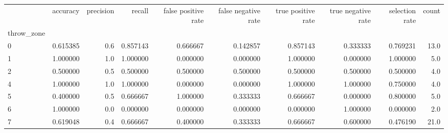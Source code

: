 \begin{tabular}{lrrrrrrrrr}
\toprule
{} &  accuracy &  precision &    recall &  false positive rate &  false negative rate &  true positive rate &  true negative rate &  selection rate &  count \\
throw\_zone &           &            &           &                      &                      &                     &                     &                 &        \\
\midrule
0          &  0.615385 &        0.6 &  0.857143 &             0.666667 &             0.142857 &            0.857143 &            0.333333 &        0.769231 &   13.0 \\
1          &  1.000000 &        1.0 &  1.000000 &             0.000000 &             0.000000 &            1.000000 &            0.000000 &        1.000000 &    5.0 \\
2          &  0.500000 &        0.5 &  0.500000 &             0.500000 &             0.500000 &            0.500000 &            0.500000 &        0.500000 &    4.0 \\
4          &  1.000000 &        1.0 &  1.000000 &             0.000000 &             0.000000 &            1.000000 &            1.000000 &        0.750000 &    4.0 \\
5          &  0.400000 &        0.5 &  0.666667 &             1.000000 &             0.333333 &            0.666667 &            0.000000 &        0.800000 &    5.0 \\
6          &  1.000000 &        0.0 &  0.000000 &             0.000000 &             0.000000 &            0.000000 &            1.000000 &        0.000000 &    2.0 \\
7          &  0.619048 &        0.4 &  0.666667 &             0.400000 &             0.333333 &            0.666667 &            0.600000 &        0.476190 &   21.0 \\
\bottomrule
\end{tabular}
